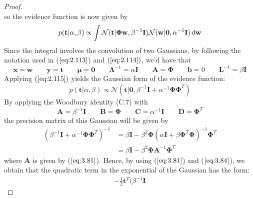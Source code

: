 \begin{proof}
\[    \] 
    so the evidence function is now given by
    \[
        p(\mathbf{t} | \alpha, \beta) 
        \propto \int \mathcal{N}(\mathbf{t} | \mathbf{\Phi}\mathbf{w}, \beta^{-1}\mathbf{I})
        \mathcal{N}(\mathbf{w} | \mathbf{0}, \alpha^{-1}\mathbf{I}) \mathop{}\!\mathrm{d} \mathbf{w}
    \] 
    Since the integral involves the convolution of two
    Gaussians, by following the notation used in ($\ref{eq:2.113}$)
    and  $(\ref{eq:2.114})$, we'd have that
     \[
         \mathbf{x} = \mathbf{w}
         \hspace{2em}
         \mathbf{y} = \mathbf{t}
         \hspace{2em}
         \bm{\mu} = \mathbf{0} 
         \hspace{2em}
         \mathbf{\Lambda}^{-1} = \alpha \mathbf{I}
         \hspace{2em}
         \mathbf{A} = \mathbf{\Phi}
         \hspace{2em}
         \mathbf{b} = 0
         \hspace{2em}
         \mathbf{L}^{-1} = \beta\mathbf{I}
    \] 
    Applying $(\ref{eq:2.115})$ yields the Gaussian form of the evidence function:
    \[
        p(\mathbf{t} | \alpha, \beta) 
        \propto \mathcal{N}(\mathbf{t} | \mathbf{0}, \beta^{-1}\mathbf{I} + 
        \alpha^{-1}\mathbf{\Phi}\mathbf{\Phi}^T)
    \] 
    By applying the Woodbury identity (C.7) with 
    \[ 
        \mathbf{A} = \beta^{-1}\mathbf{I}
        \hspace{2em}
        \mathbf{B} = \mathbf{\Phi}
        \hspace{2em}
        \mathbf{C} = \alpha^{-1}\mathbf{I}
        \hspace{2em}
        \mathbf{D} = \mathbf{\Phi}^T
    \]
    the precision matrix of this Gaussian will be given by
    \begin{align*}
        (\beta^{-1}\mathbf{I} + \alpha^{-1}\mathbf{\Phi}\mathbf{\Phi}^T)^{-1}
        &= \beta \mathbf{I} - \beta^2 \mathbf{\Phi}(\alpha \mathbf{I}
            + \beta\mathbf{\Phi}^T\mathbf{\Phi})^{-1} \mathbf{\Phi}^T \\
        &= \beta \mathbf{I} - \beta^2 \mathbf{\Phi} \mathbf{A}^{-1} \mathbf{\Phi}^T
    \end{align*}
    where $\mathbf{A}$ is given by ($\ref{eq:3.81}$). Hence,
    by using ($\ref{eq:3.81}$) and ($\ref{eq:3.84}$),
    we obtain that the quadratic term in the exponential of
    the Gaussian has the form:
    \begin{align*}
        -\frac{1}{2}\mathbf{t}^T(\beta^{-1}\mathbf{I} 

\end{align*}
\end{proof}

